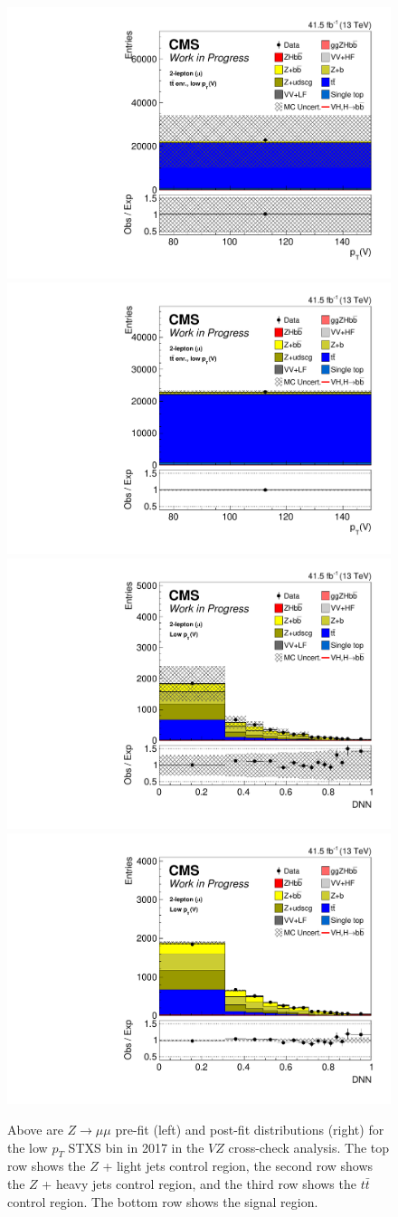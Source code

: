 \begin{figure}
  \includegraphics[width=0.35\linewidth]{figures/210323_STXS_VZ_unblinded_XbbVZ_8fe9e9cd_postfitplots/plot_shapes_vhbb_Zmm_4_13TeV2017_prefit}
  \includegraphics[width=0.35\linewidth]{figures/210323_STXS_VZ_unblinded_XbbVZ_8fe9e9cd_postfitplots/plot_shapes_vhbb_Zmm_4_13TeV2017_postfit} \\
  \includegraphics[width=0.35\linewidth]{figures/210323_STXS_VZ_unblinded_XbbVZ_8fe9e9cd_postfitplots/plot_shapes_vhbb_Zmm_1_13TeV2017_prefit}
  \includegraphics[width=0.35\linewidth]{figures/210323_STXS_VZ_unblinded_XbbVZ_8fe9e9cd_postfitplots/plot_shapes_vhbb_Zmm_1_13TeV2017_postfit} \\
  \caption[$Z\rightarrow \mu\mu$ $V\!Z$ distributions for low $p_T$ in 2017]{
    Above are $Z\rightarrow \mu\mu$ pre-fit (left) and post-fit distributions (right)
    for the low $p_T$ STXS bin in 2017 in the $V\!Z$ cross-check analysis.
    The top row shows the $Z$ + light jets control region,
    the second row shows the $Z$ + heavy jets control region,
    and the third row shows the $t\bar{t}$ control region.
    The bottom row shows the signal region.
  }
  \label{fig:vz-zmm-low-2017}
\end{figure}
